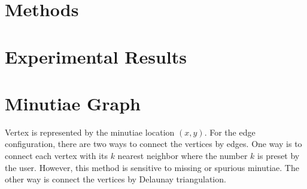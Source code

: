 \documentclass[12pt, a4paper]{article}
\begin{document}
\begin{spacing}{1}
    \section{Methods}
    \label{sec:method}


    \section{Experimental Results}
    \label{sec:experiment}


    \section{Minutiae Graph}
    Vertex is represented by the minutiae location $(x, y)$. For the edge configuration, there are two ways to connect the vertices by edges. One way is to connect each vertex with its $k$ nearest neighbor where the number $k$ is preset by the user. However, this method is sensitive to missing or spurious minutiae. The other way is connect the vertices by Delaunay triangulation.





\end{spacing}
\end{document}
